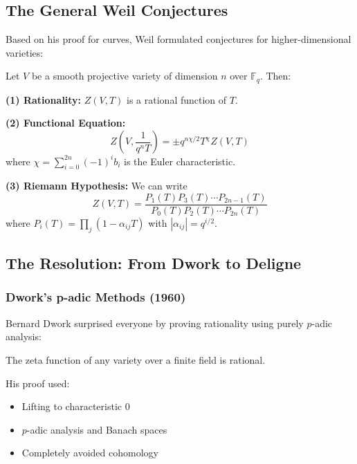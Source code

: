 \subsection{The General Weil Conjectures}

Based on his proof for curves, Weil formulated conjectures for higher-dimensional varieties:

\begin{conjecture}
\label{conj:weil}
Let $V$ be a smooth projective variety of dimension $n$ over $\mathbb{F}_q$. Then:

\textbf{(1) Rationality:} $Z(V,T)$ is a rational function of $T$.

\textbf{(2) Functional Equation:}
\begin{equation}
Z\left(V, \frac{1}{q^n T}\right) = \pm q^{n\chi/2} T^{\chi} Z(V,T)
\end{equation}
where $\chi = \sum_{i=0}^{2n} (-1)^i b_i$ is the Euler characteristic.

\textbf{(3) Riemann Hypothesis:} We can write
\begin{equation}
Z(V,T) = \frac{P_1(T)P_3(T)\cdots P_{2n-1}(T)}{P_0(T)P_2(T)\cdots P_{2n}(T)}
\end{equation}
where $P_i(T) = \prod_j (1-\alpha_{ij}T)$ with $|\alpha_{ij}| = q^{i/2}$.
\end{conjecture}

\subsection{The Resolution: From Dwork to Deligne}

\subsubsection{Dwork's p-adic Methods (1960)}

Bernard Dwork surprised everyone by proving rationality using purely $p$-adic analysis:

\begin{theorem}[Dwork, 1960]
The zeta function of any variety over a finite field is rational.
\end{theorem}

His proof used:
\begin{itemize}
\item Lifting to characteristic 0
\item $p$-adic analysis and Banach spaces
\item Completely avoided cohomology
\end{itemize}

